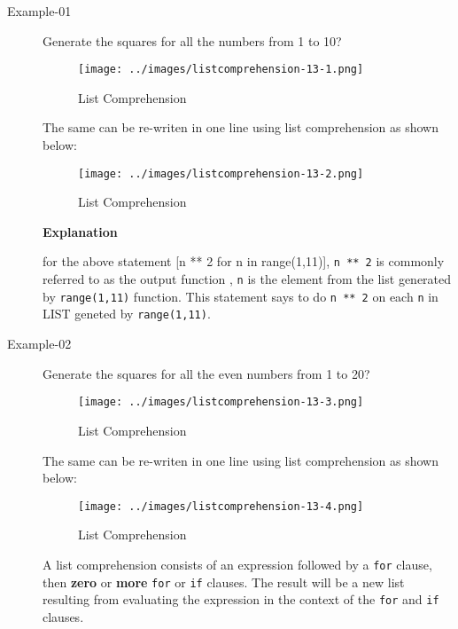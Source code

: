 \documentclass{book}
\begin{document}
\begin{description}

\item [Example-01]

Generate the squares for all the numbers from 1 to 10?

\begin{figure}[ht]
\begin{center}
\texttt{[image: ../images/listcomprehension-13-1.png]}
\caption{List Comprehension}
\label{List Comprehension}
\end{center}
\end{figure}

The same can be re-writen in one line using list comprehension as shown below:
\begin{figure}[ht]
\begin{center}
\texttt{[image: ../images/listcomprehension-13-2.png]}
\caption{List Comprehension}
\label{List Comprehension}
\end{center}
\end{figure}

\textbf{Explanation}

for the above statement [n ** 2 for n in range(1,11)], \texttt{n ** 2} is commonly referred to as the output function , \texttt{n} is the element from the list generated by \texttt{range(1,11)} function. This statement says to do \texttt{n ** 2} on each \texttt{n} in LIST geneted by \texttt{range(1,11)}.

\item [Example-02]

Generate the squares for all the even numbers from 1 to 20?

\begin{figure}[ht]
\begin{center}
\texttt{[image: ../images/listcomprehension-13-3.png]}
\caption{List Comprehension}
\label{List Comprehension}
\end{center}
\end{figure}

The same can be re-writen in one line using list comprehension as shown below:
\begin{figure}[ht]
\begin{center}
\texttt{[image: ../images/listcomprehension-13-4.png]}
\caption{List Comprehension}
\label{List Comprehension}
\end{center}
\end{figure}

A list comprehension consists of an expression followed by a \texttt{for} clause, then \textbf{zero} or \textbf{more} \texttt{for} or \texttt{if} clauses. The result will be a new list resulting from evaluating the expression in the context of the \texttt{for} and \texttt{if} clauses.
\end{description}
\end{document}
